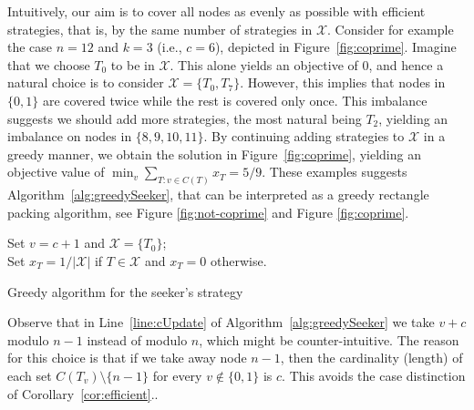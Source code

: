 \documentclass[11pt]{article}
\newcommand\+{\mkern2mu}
\newcommand{\T}{T}
\begin{document}
Intuitively, our aim is to cover all nodes as evenly as possible with efficient strategies, that is, by the same number of strategies in $\mathcal{X}$. Consider for example the case $n=12$ and $k=3$ (i.e., $c=6$), depicted in Figure~\ref{fig:coprime}. Imagine that we choose $\T_0$ to be in $\mathcal{X}$. This alone yields an objective of 0, and hence a natural choice is to consider $\mathcal{X}=\{\T_0,\T_7\}$. However, this implies that nodes in $\{0,1\}$ are covered twice while the rest is covered only once. This imbalance suggests we should add more strategies, the most natural being $\T_2$, yielding an imbalance on nodes in $\{8,9,10,11\}$. By continuing adding strategies to $\mathcal{X}$ in a greedy manner, we obtain the solution in Figure~\ref{fig:coprime}, yielding an objective value of $\min_v \sum_{T: v\in C(T)} x_T=5/9$. These examples suggests Algorithm~\ref{alg:greedySeeker}, that can be interpreted as a greedy rectangle  packing algorithm, see Figure \ref{fig:not-coprime} and Figure \ref{fig:coprime}.
\begin{algorithm}[htb!]
    \SetAlgoLined
     Set $v=c+1$ and $\mathcal{X} =\{\T_0\}$;\\
     \While{$v\not\in\{0,1\}$}{
        $\mathcal{X} = \mathcal{X}\cup \{\T_v\}$\\
        $v = (v+c) \mod n-1.$\label{line:cUpdate}
    }
    Set $x_T=1/|\mathcal{X}|$ if $T\in \mathcal{X}$ and $x_T=0$ otherwise.
\caption{Greedy algorithm for the seeker's strategy}
\label{alg:greedySeeker}
\end{algorithm}

Observe that in Line~\ref{line:cUpdate} of Algorithm~\ref{alg:greedySeeker} we take $v+c$ modulo $n-1$ instead of modulo $n$, which might be counter-intuitive. The reason for this choice is that if we take away node $n-1$, then the cardinality (length) of each set $C(T_v)\setminus\{n-1\}$ for every $v\not\in \{0,1\}$ is $c$. This avoids the case distinction of Corollary~\ref{cor:efficient}..
\end{document}
